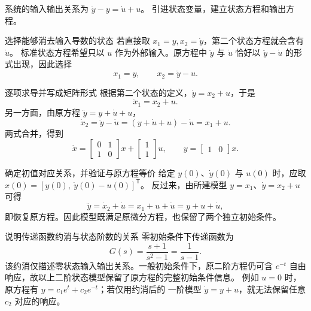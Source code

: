 \documentclass[11pt]{article}
\begin{document}
\begin{problem}[原题 4：含输入导数的微分方程建模]
系统的输入输出关系为 $\ddot y-y=\dot u+u$。
引进状态变量，建立状态方程和输出方程。
\end{problem}
\begin{solution}
\begin{proofstep}{选择能够消去输入导数的状态}
若直接取 $x_1=y,x_2=\dot y$，第二个状态方程就会含有 $\dot u$。
标准状态方程希望只以 $u$ 作为外部输入。原方程中 $\ddot y$ 与 $\dot u$
恰好以 $\ddot y-\dot u$ 的形式出现，因此选择
\[
 x_1=y,\qquad x_2=\dot y-u.
\]
\end{proofstep}
\begin{proofstep}{逐项求导并写成矩阵形式}
根据第二个状态的定义，$\dot y=x_2+u$，于是
\[
\dot x_1=x_2+u.
\]
另一方面，由原方程 $\ddot y=y+\dot u+u$，
\[
\dot x_2=\ddot y-\dot u=(y+\dot u+u)-\dot u=x_1+u.
\]
两式合并，得到
\[
\boxed{\dot x=
\begin{bmatrix}0&1\\1&0\end{bmatrix}x+
\begin{bmatrix}1\\1\end{bmatrix}u,\qquad
y=\begin{bmatrix}1&0\end{bmatrix}x.}
\]
\end{proofstep}
\begin{proofstep}{确定初值对应关系，并验证与原方程等价}
给定 $y(0)$、$\dot y(0)$ 与 $u(0)$ 时，应取
$x(0)=[y(0),\ \dot y(0)-u(0)]^{\mathsf T}$。
反过来，由所建模型 $y=x_1$、$\dot y=x_2+u$ 可得
\[
\ddot y=\dot x_2+\dot u=x_1+u+\dot u=y+u+\dot u,
\]
即恢复原方程。因此模型既满足原微分方程，也保留了两个独立初始条件。
\end{proofstep}
\begin{proofstep}{说明传递函数约消与状态阶数的关系}
零初始条件下传递函数为
\[
G(s)=\frac{s+1}{s^2-1}=\frac{1}{s-1}.
\]
该约消仅描述零状态输入输出关系。一般初始条件下，原二阶方程仍可含
$e^{-t}$ 自由响应，故以上二阶状态模型保留了原方程的完整初始条件信息。
例如 $u=0$ 时，原方程有 $y=c_1e^t+c_2e^{-t}$；若仅用约消后的
一阶模型 $\dot y=y+u$，就无法保留任意 $c_2$ 对应的响应。
\end{proofstep}
\end{solution}
\end{document}
